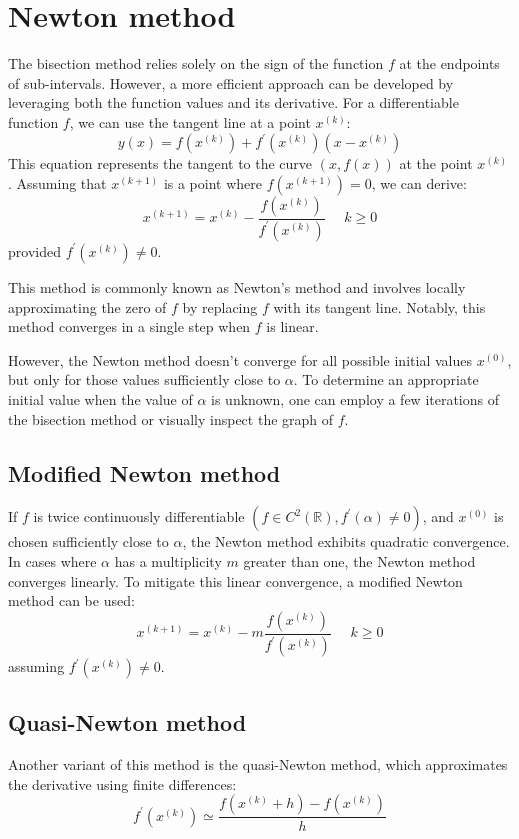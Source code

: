 \section{Newton method}

The bisection method relies solely on the sign of the function $f$ at the endpoints of sub-intervals. 
However, a more efficient approach can be developed by leveraging both the function values and its derivative.
For a differentiable function $f$, we can use the tangent line at a point $x^{(k)}$: 
\[y(x)=f(x^{(k)})+f^{'}(x^{(k)})(x-x^{(k)})\]
This equation represents the tangent to the curve $(x,f(x))$ at the point $x^{(k)}$. 
Assuming that $x^{(k+1)}$ is a point where $f(x^{(k+1)})=0$, we can derive:
\[x^{(k+1)}=x^{(k)}-\dfrac{f(x^{(k)})}{f^{'}(x^{(k)})} \:\:\:\:\:\: k \geq 0\]
provided $f^{'}(x^{(k)}) \neq 0$. 

This method is commonly known as Newton's method and involves locally approximating the zero of $f$ by replacing $f$ with its tangent line.
Notably, this method converges in a single step when $f$ is linear.

However, the Newton method doesn't converge for all possible initial values $x^{(0)}$, but only for those values sufficiently close to $\alpha$. 
To determine an appropriate initial value when the value of $\alpha$ is unknown, one can employ a few iterations of the bisection method or visually inspect the graph of $f$. 

\subsection*{Modified Newton method}
If $f$ is twice continuously differentiable $\left(f \in C^2(\mathbb{R}),f^{'}(\alpha) \neq 0\right)$, and $x^{(0)}$ is chosen sufficiently close to $\alpha$, the Newton method exhibits quadratic convergence.
In cases where $\alpha$  has a multiplicity $m$ greater than one, the Newton method converges linearly. 
To mitigate this linear convergence, a modified Newton method can be used:
\[x^{(k+1)}=x^{(k)}-m\dfrac{f(x^{(k)})}{f^{'}(x^{(k)})} \:\:\:\:\:\: k \geq 0\]
assuming $f^{'}(x^{(k)}) \neq 0$.

\subsection*{Quasi-Newton method}
Another variant of this method is the quasi-Newton method, which approximates the derivative using finite differences:
\[f^{'}(x^{(k)}) \simeq \dfrac{f(x^{(k)}+h)-f(x^{(k)})}{h}\]


